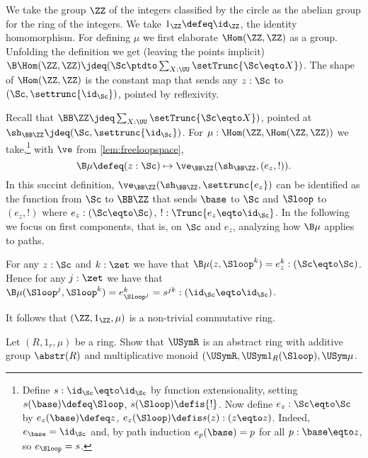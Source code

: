 \begin{example}
We take the group $\ZZ$ of the integers classified by the circle
as the abelian group for the ring of the integers.
We take $1_\ZZ \defeq \id_\ZZ$, the identity homomorphism.
For defining $\mu$ we first elaborate $\Hom(\ZZ,\ZZ)$ as a group.
Unfolding the definition we get (leaving the points implicit)
$\B\Hom(\ZZ,\ZZ) \jdeq(\Sc\ptdto\sum_{X:\UU}\setTrunc{\Sc\eqto X})$.
The shape of $\Hom(\ZZ,\ZZ)$ is the constant map 
that sends any $z:\Sc$ to $(\Sc,\settrunc{\id_{\Sc}})$, pointed by reflexivity.

Recall that $\BB\ZZ \jdeq \sum_{X:\UU}\setTrunc{\Sc\eqto X})$,
pointed at $\sh_{\BB\ZZ}\jdeq (\Sc,\settrunc{\id_\Sc})$.
For $\mu: \Hom(\ZZ,\Hom(\ZZ,\ZZ))$ we take,\footnote{
Define $s:\id_\Sc\eqto\id_\Sc$ by function extensionality,
setting $s(\base)\defeq\Sloop$, $s(\Sloop)\defis {!}$.
Now define $e_z: \Sc\eqto\Sc$ by $e_z(\base)\defeq z$,
$e_z(\Sloop) \defis s(z) : (z\eqto z)$. Indeed, $e_\base = \id_\Sc$
and, by path induction $e_p(\base)=p$ for all $p:\base\eqto z$,
so $e_{\Sloop} = s$.}
with $\ve$ from \cref{lem:freeloopspace},
\[
\B\mu \defeq (z:\Sc) \mapsto \ve_{\BB\ZZ}(\sh_{\BB\ZZ},(e_z,!)).
\]
In this succint definition, $\ve_{\BB\ZZ}(\sh_{\BB\ZZ},\settrunc{e_z})$
can be identified as the function from $\Sc$ to $\BB\ZZ$ that sends 
$\base$ to $\Sc$ and $\Sloop$ to $(e_z,!)$ where $e_z:(\Sc\eqto\Sc)$,
$!: \Trunc{e_z\eqto\id_\Sc}$. In the following we focus on first components,
that is, on $\Sc$ and $e_z$, analyzing how $\B\mu$ applies to paths.

For any $z:\Sc$ and $k:\zet$ we have that 
$\B\mu(z,{\Sloop}^k)= e_z^k : (\Sc\eqto\Sc)$.
Hence for any $j:\zet$ we have that 
$\B\mu({\Sloop}^j,{\Sloop}^k )= e_{{\Sloop}^j}^k = s^{jk}: (\id_\Sc\eqto\id_\Sc)$.




It follows that
$(\ZZ,1_\ZZ,\mu)$ is a non-trivial commutative ring.
\end{example}

\begin{xca}\label{xca:Rconcring->URabstring}
Let $(R,1_r,\mu)$ be a ring. Show that $\USymR$ is an abstract ring with
additive group $\abstr(R)$ and multiplicative monoid 
$(\USymR,\USym1_R(\Sloop),\USym\mu$. 
\end{xca}



